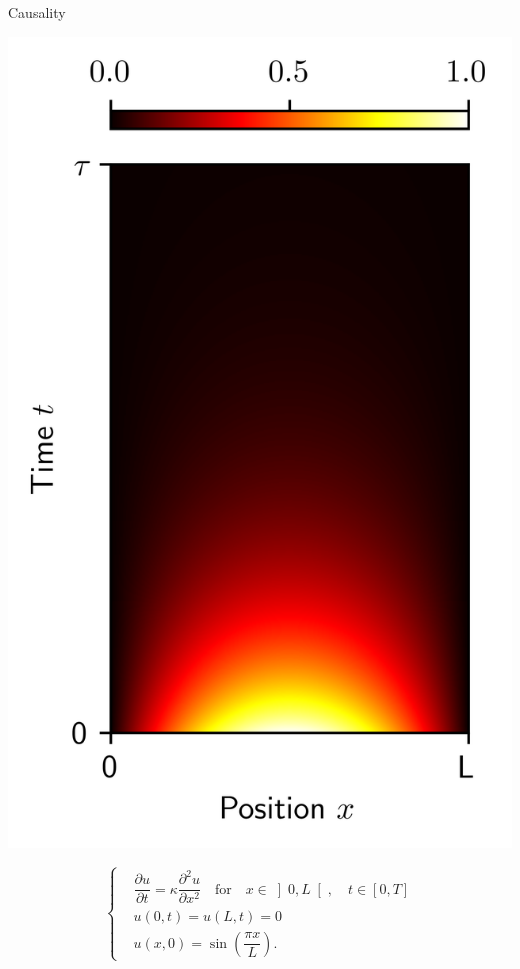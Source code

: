 \documentclass[aspectratio=169,compress,12pt,dvipsnames]{beamer}
\begin{document}
\begin{frame}{Causality}
  \vfill
  \begin{minipage}{.28\textwidth}
    \centering
    \includegraphics[width=\textwidth]{true_solution.png}
  \end{minipage}%
  \hfill
  \begin{minipage}{.68\textwidth}
  \[
    \left\{
      \begin{aligned}
        & \dfrac{\partial u}{\partial t} = \kappa \dfrac{\partial^2 u}{\partial x^2} \quad \text{for} \quad x \in \left]0, L\right[, \quad  t \in \left[0, T \right]  \\
        & u(0, t) = u(L, t) = 0 \\
        & u(x, 0) = \sin \left( \dfrac{\pi x}{L} \right).
      \end{aligned}
      \right.
    \]
  \end{minipage}
  \vfill
\end{frame}
\end{document}
